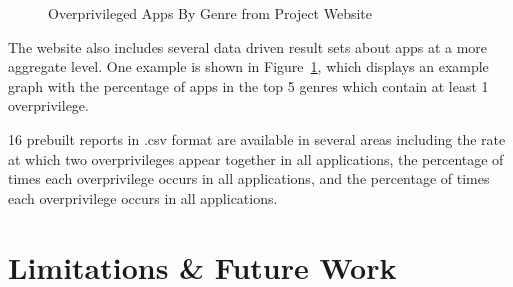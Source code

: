 \documentclass{sig-alternate}
\begin{document}
 \begin{figure}[ht!]
\centering
 \par{}
\caption{Overprivileged Apps By Genre from Project Website}
\label{fig:overprivappsByGenre}
\end{figure}



The website also includes several data driven result sets about apps at a more aggregate level. One example is shown in Figure~\ref{fig:overprivappsByGenre}, which displays an example graph with the percentage of apps in the top 5 genres which contain at least 1 overprivilege.




16 prebuilt reports in .csv format are available in several areas including the rate at which two overprivileges appear together in all applications, the percentage of times each overprivilege occurs in all applications, and the percentage of times each overprivilege occurs in all applications.





\section{Limitations \& Future Work}
\label{sec:limitations}
\end{document}
